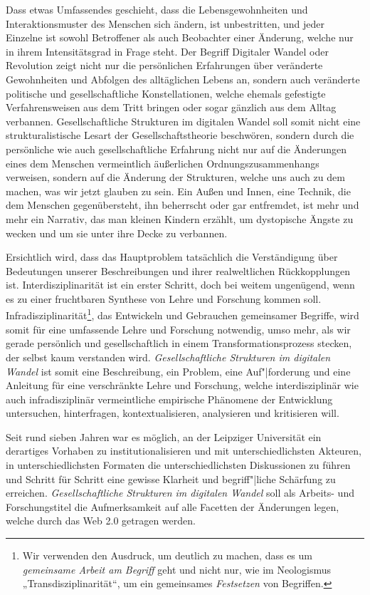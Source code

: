 \documentclass[12pt,a4paper]{article}
\begin{document}
Dass etwas Umfassendes geschieht, dass die Lebensgewohnheiten und
Interaktionsmuster des Menschen sich ändern, ist unbestritten, und jeder
Einzelne ist sowohl Betroffener als auch Beobachter einer Änderung, welche nur
in ihrem Intensitätsgrad in Frage steht. Der Begriff Digitaler Wandel oder
Revolution zeigt nicht nur die persönlichen Erfahrungen über veränderte
Gewohnheiten und Abfolgen des alltäglichen Lebens an, sondern auch veränderte
politische und gesellschaftliche Konstellationen, welche ehemals gefestigte
Verfahrensweisen aus dem Tritt bringen oder sogar gänzlich aus dem Alltag
verbannen. Gesellschaftliche Strukturen im digitalen Wandel soll somit nicht
eine strukturalistische Lesart der Gesellschaftstheorie beschwören, sondern
durch die persönliche wie auch gesellschaftliche Erfahrung nicht nur auf die
Änderungen eines dem Menschen vermeintlich äußerlichen Ordnungszusammenhangs
verweisen, sondern auf die Änderung der Strukturen, welche uns auch zu dem
machen, was wir jetzt glauben zu sein. Ein Außen und Innen, eine Technik, die
dem Menschen gegenübersteht, ihn beherrscht oder gar entfremdet, ist mehr und
mehr ein Narrativ, das man kleinen Kindern erzählt, um dystopische Ängste zu
wecken und um sie unter ihre Decke zu verbannen.

Ersichtlich wird, dass das Hauptproblem tatsächlich die Verständigung über
Bedeutungen unserer Beschreibungen und ihrer realweltlichen Rückkopplungen
ist.  Interdisziplinarität ist ein erster Schritt, doch bei weitem ungenügend,
wenn es zu einer fruchtbaren Synthese von Lehre und Forschung kommen soll.
Infradisziplinarität\footnote{Wir verwenden den Ausdruck, um deutlich zu
  machen, dass es um \emph{gemeinsame Arbeit am Begriff} geht und nicht nur,
  wie im Neologismus „Transdisziplinarität“, um ein gemeinsames
  \emph{Festsetzen} von Begriffen.}, das Entwickeln und Gebrauchen gemeinsamer
Begriffe, wird somit für eine umfassende Lehre und Forschung notwendig, umso
mehr, als wir gerade persönlich und gesellschaftlich in einem
Transformationsprozess stecken, der selbst kaum verstanden
wird. \emph{Gesellschaftliche Strukturen im digitalen Wandel} ist somit eine
Beschreibung, ein Problem, eine Auf"|forderung und eine Anleitung für eine
verschränkte Lehre und Forschung, welche interdisziplinär wie auch
infradisziplinär vermeintliche empirische Phänomene der Entwicklung
untersuchen, hinterfragen, kontextualisieren, analysieren und kritisieren
will.

Seit rund sieben Jahren war es möglich, an der Leipziger Universität ein
derartiges Vorhaben zu institutionalisieren und mit unterschiedlichsten
Akteuren, in unterschiedlichsten Formaten die unterschiedlichsten Diskussionen
zu führen und Schritt für Schritt eine gewisse Klarheit und begriff"|liche
Schärfung zu erreichen. \emph{Gesellschaftliche Strukturen im digitalen
  Wandel} soll als Arbeits- und Forschungstitel die Aufmerksamkeit auf alle
Facetten der Änderungen legen, welche durch das Web 2.0 getragen werden.
\enlargethispage{1em}
\end{document}

